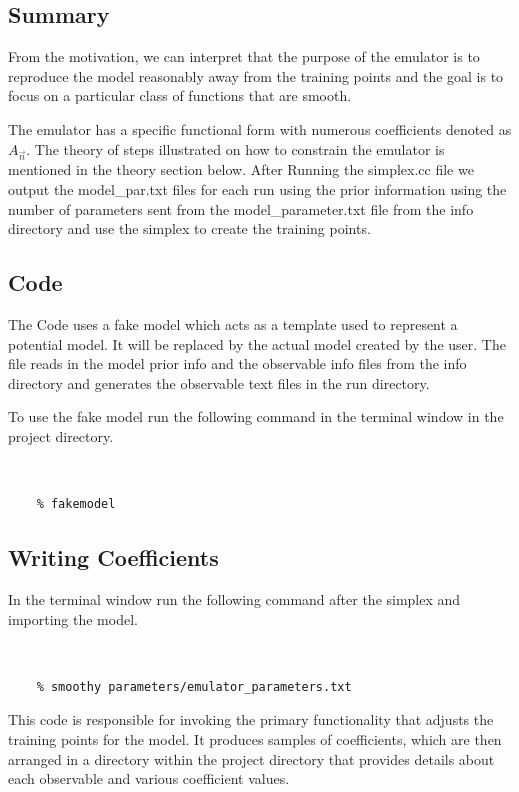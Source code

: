\documentclass[12pt]{article}
\numberwithin{equation}{section}
\numberwithin{figure}{section}
\begin{document}
\subsection{Summary}

From the motivation, we can interpret that the purpose of the emulator is to reproduce the model reasonably away from the training points and the goal is to focus on a particular class of functions that are smooth. 

The emulator has a specific functional form with numerous coefficients denoted as $A_{\vec{n}}$. The theory of steps illustrated on how to constrain the emulator is mentioned in the theory section below.  After Running the simplex.cc file we output the model\_par.txt files for each run using the prior information using the number of parameters sent from the model\_parameter.txt file from the info directory and use the simplex to create the training points.

\subsection{Code}

The Code uses a fake model which acts as a template used to represent a potential model. It will be replaced by the actual model created by the user. The file reads in the model prior info and the observable info files from the info directory and generates the observable text files in the run directory. 

To use the fake model run the following command in the terminal window in the project directory. 

{\tt 
\begin{verbatim}
    % fakemodel 
\end{verbatim}
}
 
\subsection{Writing Coefficients}

In the terminal window run the following command after the simplex and importing the model.

{\tt 
\begin{verbatim}
    % smoothy parameters/emulator_parameters.txt 
\end{verbatim}
}

This code is responsible for invoking the primary functionality that adjusts the training points for the model. It produces samples of coefficients, which are then arranged in a directory within the project directory that provides details about each observable and various coefficient values.
\end{document}
